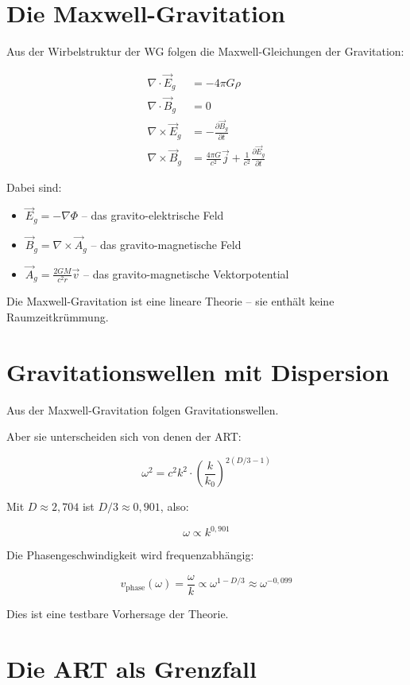 \section{Die Maxwell-Gravitation}

Aus der Wirbelstruktur der WG folgen die Maxwell-Gleichungen der Gravitation:

\[
\begin{aligned}
\nabla \cdot \vec{E}_g &= -4\pi G \rho \\
\nabla \cdot \vec{B}_g &= 0 \\
\nabla \times \vec{E}_g &= -\frac{\partial \vec{B}_g}{\partial t} \\
\nabla \times \vec{B}_g &= \frac{4\pi G}{c^2} \vec{j} + \frac{1}{c^2} \frac{\partial \vec{E}_g}{\partial t}
\end{aligned}
\]

Dabei sind:
\begin{itemize}
\item \( \vec{E}_g = -\nabla \Phi \) – das gravito-elektrische Feld
\item \( \vec{B}_g = \nabla \times \vec{A}_g \) – das gravito-magnetische Feld
\item \( \vec{A}_g = \frac{2GM}{c^2 r} \vec{v} \) – das gravito-magnetische Vektorpotential
\end{itemize}

Die Maxwell-Gravitation ist eine lineare Theorie – sie enthält keine Raumzeitkrümmung.

\section{Gravitationswellen mit Dispersion}

Aus der Maxwell-Gravitation folgen Gravitationswellen.

Aber sie unterscheiden sich von denen der ART:

\[
\omega^2 = c^2 k^2 \cdot \left( \frac{k}{k_0} \right)^{2(D/3-1)}
\]

Mit \( D \approx 2,704 \) ist \( D/3 \approx 0,901 \), also:

\[
\omega \propto k^{0,901}
\]

Die Phasengeschwindigkeit wird frequenzabhängig:

\[
v_{\text{phase}}(\omega) = \frac{\omega}{k} \propto \omega^{1-D/3} \approx \omega^{-0,099}
\]

Dies ist eine testbare Vorhersage der Theorie.

\section{Die ART als Grenzfall}


